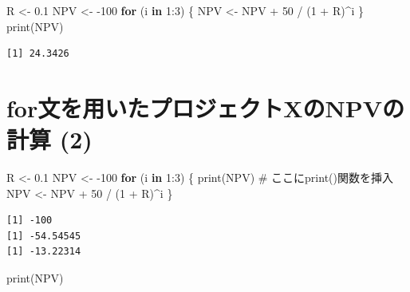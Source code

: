 \documentclass[
  letterpaper,
  DIV=11,
  numbers=noendperiod]{scrreprt}
\newenvironment{Shaded}{\begin{snugshade}}{\end{snugshade}}
\newcommand{\CommentTok}[1]{\textcolor[rgb]{0.37,0.37,0.37}{#1}}
\newcommand{\ControlFlowTok}[1]{\textcolor[rgb]{0.00,0.23,0.31}{\textbf{#1}}}
\newcommand{\DecValTok}[1]{\textcolor[rgb]{0.68,0.00,0.00}{#1}}
\newcommand{\FloatTok}[1]{\textcolor[rgb]{0.68,0.00,0.00}{#1}}
\newcommand{\FunctionTok}[1]{\textcolor[rgb]{0.28,0.35,0.67}{#1}}
\newcommand{\NormalTok}[1]{\textcolor[rgb]{0.00,0.23,0.31}{#1}}
\newcommand{\OtherTok}[1]{\textcolor[rgb]{0.00,0.23,0.31}{#1}}
\newcommand{\SpecialCharTok}[1]{\textcolor[rgb]{0.37,0.37,0.37}{#1}}
\begin{document}
\begin{Shaded}
\begin{Highlighting}[]
\NormalTok{R }\OtherTok{\textless{}{-}} \FloatTok{0.1}
\NormalTok{NPV }\OtherTok{\textless{}{-}} \SpecialCharTok{{-}}\DecValTok{100}
\ControlFlowTok{for}\NormalTok{ (i }\ControlFlowTok{in} \DecValTok{1}\SpecialCharTok{:}\DecValTok{3}\NormalTok{) \{}
\NormalTok{  NPV }\OtherTok{\textless{}{-}}\NormalTok{ NPV }\SpecialCharTok{+} \DecValTok{50} \SpecialCharTok{/}\NormalTok{ (}\DecValTok{1} \SpecialCharTok{+}\NormalTok{ R)}\SpecialCharTok{\^{}}\NormalTok{i}
\NormalTok{\}}
\FunctionTok{print}\NormalTok{(NPV)}
\end{Highlighting}
\end{Shaded}

\begin{verbatim}
[1] 24.3426
\end{verbatim}

\section{for文を用いたプロジェクトXのNPVの計算
(2)}\label{forux6587ux3092ux7528ux3044ux305fux30d7ux30edux30b8ux30a7ux30afux30c8xux306enpvux306eux8a08ux7b97-2}

\begin{Shaded}
\begin{Highlighting}[]
\NormalTok{R }\OtherTok{\textless{}{-}} \FloatTok{0.1}
\NormalTok{NPV }\OtherTok{\textless{}{-}} \SpecialCharTok{{-}}\DecValTok{100}
\ControlFlowTok{for}\NormalTok{ (i }\ControlFlowTok{in} \DecValTok{1}\SpecialCharTok{:}\DecValTok{3}\NormalTok{) \{}
  \FunctionTok{print}\NormalTok{(NPV) }\CommentTok{\# ここにprint()関数を挿入}
\NormalTok{  NPV }\OtherTok{\textless{}{-}}\NormalTok{ NPV }\SpecialCharTok{+} \DecValTok{50} \SpecialCharTok{/}\NormalTok{ (}\DecValTok{1} \SpecialCharTok{+}\NormalTok{ R)}\SpecialCharTok{\^{}}\NormalTok{i}
\NormalTok{\}}
\end{Highlighting}
\end{Shaded}

\begin{verbatim}
[1] -100
[1] -54.54545
[1] -13.22314
\end{verbatim}

\begin{Shaded}
\begin{Highlighting}[]
\FunctionTok{print}\NormalTok{(NPV)}
\end{Highlighting}
\end{Shaded}
\end{document}
